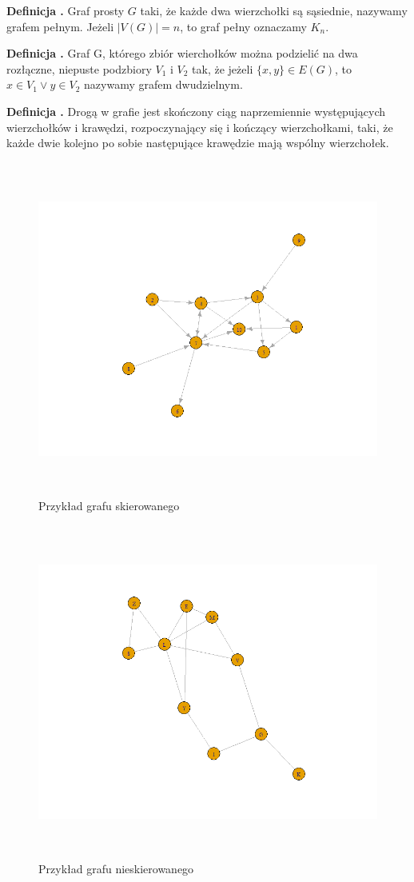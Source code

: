 \noindent
\textbf{Definicja \graphDefinitionIndex.}
\incrementGraphDefinitionIndex
Graf prosty $G$ taki, że każde dwa wierzchołki są sąsiednie, nazywamy grafem pełnym.
Jeżeli $|V(G)| = n$, to graf pełny oznaczamy $K_n$.

\noindent
\textbf{Definicja \graphDefinitionIndex.}
\incrementGraphDefinitionIndex
Graf G, którego zbiór wierchołków można podzielić na dwa rozłączne, niepuste podzbiory $V_1$ i $V_2$ tak,
że jeżeli $\{x, y\} \in E(G)$, to $x \in V_1 \vee y \in V_2$ nazywamy grafem dwudzielnym.

\noindent
\textbf{Definicja \graphDefinitionIndex.}
\incrementGraphDefinitionIndex
Drogą w grafie jest skończony ciąg naprzemiennie występujących wierzchołków i krawędzi, rozpoczynający się
i kończący wierzchołkami, taki, że każde dwie kolejno po sobie następujące krawędzie mają wspólny wierzchołek.

\begin{figure}[ht]
	\centering
	\includegraphics[height=11cm]{partials/images/graph_directed.png}
	\caption{Przykład grafu skierowanego}
	\label{Fig:graphs-undirected-1}
\end{figure}
\FloatBarrier

\begin{figure}[ht]
	\centering
	\includegraphics[height=11cm]{partials/images/graph_undirected.png}
	\caption{Przykład grafu nieskierowanego}
	\label{Fig:graphs-directed-1}
\end{figure}
\FloatBarrier